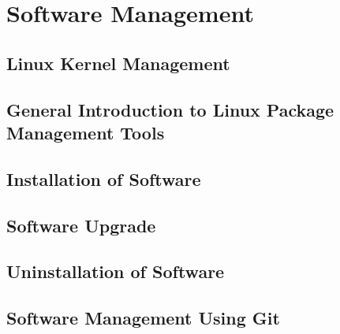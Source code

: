 \chapter{Software Management}


\section{Linux Kernel Management}

\section{General Introduction to Linux Package Management Tools}

\section{Installation of Software}

\section{Software Upgrade}

\section{Uninstallation of Software}

\section{Software Management Using Git}

















